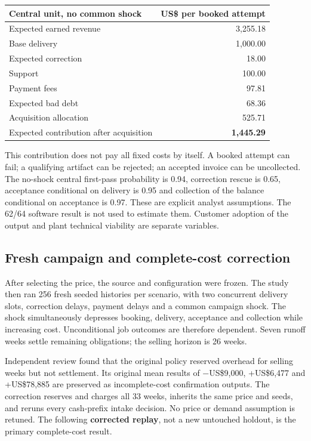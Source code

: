 \documentclass[
  11pt,
  letterpaper,
]{article}
\begin{document}
\begin{longtable}[]{@{}lr@{}}
\toprule\noalign{}
Central unit, no common shock & US\$ per booked attempt \\
\midrule\noalign{}
\endhead
\bottomrule\noalign{}
\endlastfoot
Expected earned revenue & 3,255.18 \\
Base delivery & 1,000.00 \\
Expected correction & 18.00 \\
Support & 100.00 \\
Payment fees & 97.81 \\
Expected bad debt & 68.36 \\
Acquisition allocation & 525.71 \\
Expected contribution after acquisition & \textbf{1,445.29} \\
\end{longtable}

This contribution does not pay all fixed costs by itself. A booked
attempt can fail; a qualifying artifact can be rejected; an accepted
invoice can be uncollected. The no-shock central first-pass probability
is 0.94, correction rescue is 0.65, acceptance conditional on delivery
is 0.95 and collection of the balance conditional on acceptance is 0.97.
These are explicit analyst assumptions. The 62/64 software result is not
used to estimate them. Customer adoption of the output and plant
technical viability are separate variables.

\hypertarget{fresh-campaign-and-complete-cost-correction}{%
\subsection{Fresh campaign and complete-cost
correction}\label{fresh-campaign-and-complete-cost-correction}}

After selecting the price, the source and configuration were frozen. The
study then ran 256 fresh seeded histories per scenario, with two
concurrent delivery slots, correction delays, payment delays and a
common campaign shock. The shock simultaneously depresses booking,
delivery, acceptance and collection while increasing cost. Unconditional
job outcomes are therefore dependent. Seven runoff weeks settle
remaining obligations; the selling horizon is 26 weeks.

Independent review found that the original policy reserved overhead for
selling weeks but not settlement. Its original mean results of
−US\$9,000, +US\$6,477 and +US\$78,885 are preserved as incomplete-cost
confirmation outputs. The correction reserves and charges all 33 weeks,
inherits the same price and seeds, and reruns every cash-prefix intake
decision. No price or demand assumption is retuned. The following
\textbf{corrected replay}, not a new untouched holdout, is the primary
complete-cost result.
\end{document}
